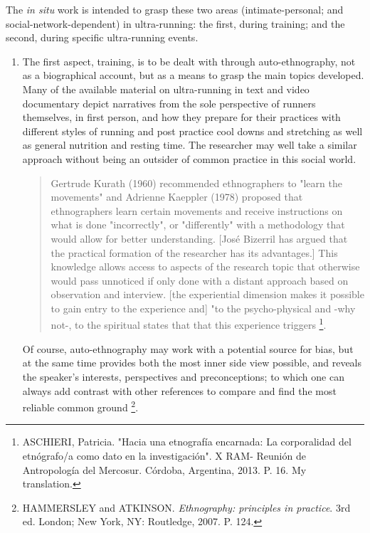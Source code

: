 The \textit{in situ} work is intended to grasp these two areas (intimate-personal; and social-network-dependent) in ultra-running: the first, during training; and the second, during specific ultra-running events.

\begin{enumerate}
 \item The first aspect, training, is to be dealt with  through auto-ethnography, not as a biographical account, but as a means to grasp the main topics developed. Many of the available material on ultra-running in text and video documentary depict narratives from the sole perspective of runners themselves, in first person, and how they prepare for their practices with different styles of running and post practice cool downs and stretching as well as general nutrition and resting time. The researcher may well take a similar approach without being an outsider of common practice in this social world.
 
 \begin{quote}
  Gertrude Kurath (1960) recommended ethnographers to "learn the movements" and Adrienne Kaeppler (1978) proposed that ethnographers learn certain movements and  receive instructions on  what is done "incorrectly", or "differently" with a methodology that would allow for better understanding.
  [José Bizerril has argued that the practical formation of the researcher has its advantages.] This knowledge allows  access to aspects of the research topic that otherwise would pass unnoticed if only done with a distant approach based on observation and interview. [the experiential dimension makes it possible to gain entry to the experience and] "to the psycho-physical and -why not-, to the spiritual states that that this experience triggers%
  \footnote{ASCHIERI, Patricia. "Hacia una etnografía encarnada: La corporalidad del etnógrafo/a como dato en la investigación". X RAM- Reunión de Antropología del Mercosur. Córdoba, Argentina, 2013. P. 16. My translation.}.
 \end{quote}
 
 Of course,  auto-ethnography may work with a potential source for bias, but at the same time provides both the most inner side view possible, and reveals the speaker's interests, perspectives and preconceptions; to which one can always add contrast with other references to compare and find the most reliable common ground%
 \footnote{HAMMERSLEY and ATKINSON. \textit{Ethnography: principles in practice}. 3rd ed. London; New York, NY: Routledge, 2007. P.%
 124.}.
 

\end{enumerate}
